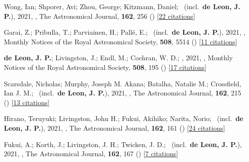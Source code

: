 \item[{\color{numcolor}\scriptsize42}] Wong, Ian; Shporer, Avi; Zhou, George; Kitzmann, Daniel; \etal\ (incl.\ \textbf{de Leon, J. P.}), 2021, , The Astronomical Journal, \textbf{162}, 256 () [\href{https://ui.adsabs.harvard.edu/abs/2021AJ....162..256W}{22 citations}]

\item[{\color{numcolor}\scriptsize41}] Garai, Z.; Pribulla, T.; Parviainen, H.; Pall{\'e}, E.; \etal\ (incl.\ \textbf{de Leon, J. P.}), 2021, , Monthly Notices of the Royal Astronomical Society, \textbf{508}, 5514 () [\href{https://ui.adsabs.harvard.edu/abs/2021MNRAS.508.5514G}{11 citations}]

\item[{\color{numcolor}\scriptsize40}] \textbf{de Leon, J. P.}; Livingston, J.; Endl, M.; Cochran, W. D.; \etal, 2021, , Monthly Notices of the Royal Astronomical Society, \textbf{508}, 195 () [\href{https://ui.adsabs.harvard.edu/abs/2021MNRAS.508..195D}{17 citations}]

\item[{\color{numcolor}\scriptsize39}] Scarsdale, Nicholas; Murphy, Joseph M. Akana; Batalha, Natalie M.; Crossfield, Ian J. M.; \etal\ (incl.\ \textbf{de Leon, J. P.}), 2021, , The Astronomical Journal, \textbf{162}, 215 () [\href{https://ui.adsabs.harvard.edu/abs/2021AJ....162..215S}{13 citations}]

\item[{\color{numcolor}\scriptsize38}] Hirano, Teruyuki; Livingston, John H.; Fukui, Akihiko; Narita, Norio; \etal\ (incl.\ \textbf{de Leon, J. P.}), 2021, , The Astronomical Journal, \textbf{162}, 161 () [\href{https://ui.adsabs.harvard.edu/abs/2021AJ....162..161H}{24 citations}]

\item[{\color{numcolor}\scriptsize37}] Fukui, A.; Korth, J.; Livingston, J. H.; Twicken, J. D.; \etal\ (incl.\ \textbf{de Leon, J. P.}), 2021, , The Astronomical Journal, \textbf{162}, 167 () [\href{https://ui.adsabs.harvard.edu/abs/2021AJ....162..167F}{7 citations}]

